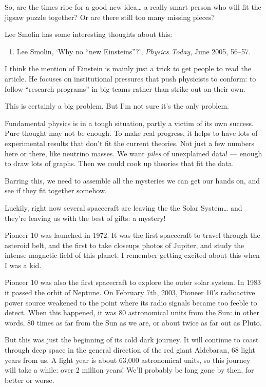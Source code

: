 \documentclass{article}
\def\tightlist{}
\begin{document}
So, are the times ripe for a good new idea\ldots{} a really smart person
who will fit the jigsaw puzzle together? Or are there still too many
missing pieces?

Lee Smolin has some interesting thoughts about this:

\begin{enumerate}
\def\labelenumi{\arabic{enumi})}
\setcounter{enumi}{3}
\tightlist
\item
  Lee Smolin, `Why no ``new Einsteins''?', \emph{Physics Today}, June
  2005, 56--57.
\end{enumerate}

I think the mention of Einstein is mainly just a trick to get people to
read the article. He focuses on institutional pressures that push
physicists to conform: to follow ``research programs'' in big teams
rather than strike out on their own.

This is certainly a big problem. But I'm not sure it's the only problem.

Fundamental physics is in a tough situation, partly a victim of its own
success. Pure thought may not be enough. To make real progress, it helps
to have lots of experimental results that don't fit the current
theories. Not just a few numbers here or there, like neutrino masses. We
want \emph{piles} of unexplained data! --- enough to draw lots of
graphs. Then we could cook up theories that fit the data.

Barring this, we need to assemble all the mysteries we can get our hands
on, and see if they fit together somehow.

Luckily, right now several spacecraft are leaving the the Solar
System\ldots{} and they're leaving us with the best of gifts: a mystery!

Pioneer 10 was launched in 1972. It was the first spacecraft to travel
through the asteroid belt, and the first to take closeups photos of
Jupiter, and study the intense magnetic field of this planet. I remember
getting excited about this when I was a kid.

Pioneer 10 was also the first spacecraft to explore the outer solar
system. In 1983 it passed the orbit of Neptune. On February 7th, 2003,
Pioneer 10's radioactive power source weakened to the point where its
radio signals became too feeble to detect. When this happened, it was 80
astronomical units from the Sun: in other words, 80 times as far from
the Sun as we are, or about twice as far out as Pluto.

But this was just the beginning of its cold dark journey. It will
continue to coast through deep space in the general direction of the red
giant Aldebaran, 68 light years from us. A light year is about 63,000
astronomical units, so this journey will take a while: over 2 million
years! We'll probably be long gone by then, for better or worse.
\end{document}
